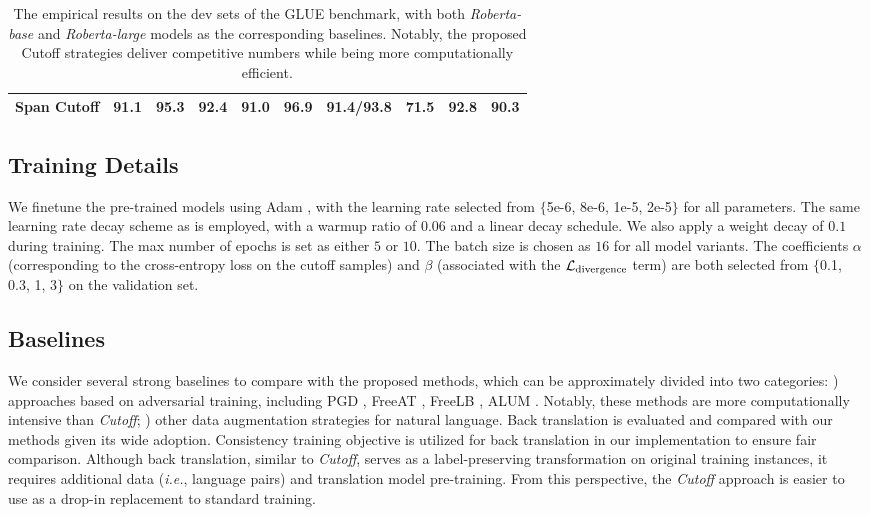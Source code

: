 \documentclass[11pt,a4paper]{article}
\begin{document}
\begin{table*}[ht!]
\begin{small}
\begin{tabular}{c||c|c|c|c|c|c|c|c|c}
			Span Cutoff  &  \textbf{91.1} &  95.3  & 92.4 & 91.0 &  96.9 & \textbf{91.4}/\textbf{93.8} & \textbf{71.5} & \textbf{92.8} & \textbf{90.3} \\
			\bottomrule[1.2pt]
		\end{tabular}\caption{The empirical results on the dev sets of the GLUE benchmark, with both \emph{Roberta-base} and \emph{Roberta-large} models as the corresponding baselines. Notably, the proposed Cutoff strategies deliver competitive numbers while being more computationally efficient.}
		\label{tab:eval}
	\end{small}
	\vspace{-2mm}
\end{table*}

\subsection{Training Details}
We finetune the pre-trained models using Adam \cite{kingma2014adam}, with the learning rate selected from $\{$5e-6, 8e-6, 1e-5, 2e-5$\}$ for all parameters. The same learning rate decay scheme as \cite{liu2019roberta} is employed, with a warmup ratio of 0.06 and a linear decay schedule. We also apply a weight decay  of $0.1$ during training. The max number of epochs is set as either $5$ or $10$. The batch size is chosen as $16$ for all model variants. The coefficients $\alpha$ (corresponding to the cross-entropy loss on the cutoff samples) and $\beta$ (associated with the $\mathcal{L}_{\rm divergence}$ term) are both selected from $\{$0.1, 0.3, 1, 3$\}$ on the validation set.

\subsection{Baselines}
We consider several strong baselines to compare with the proposed methods, which can be approximately divided into two categories: \emph{}) approaches based on adversarial training, including PGD \cite{Madry2018TowardsDL},  FreeAT \cite{shafahi2019adversarial}, FreeLB \cite{zhu2019freelb}, ALUM \cite{liu2020adversarial}. Notably, these methods are more computationally intensive than \emph{Cutoff}; \emph{}) other data augmentation strategies for natural language. Back translation is evaluated and compared with our methods given its wide adoption. Consistency training objective is utilized for back translation in our implementation to ensure fair comparison. Although back translation, similar to \emph{Cutoff}, serves as a label-preserving transformation on original training instances, it requires additional data (\emph{i.e.}, language pairs) and translation model pre-training. From this perspective, the \emph{Cutoff} approach is easier to use as a drop-in replacement to standard training.
\end{document}
